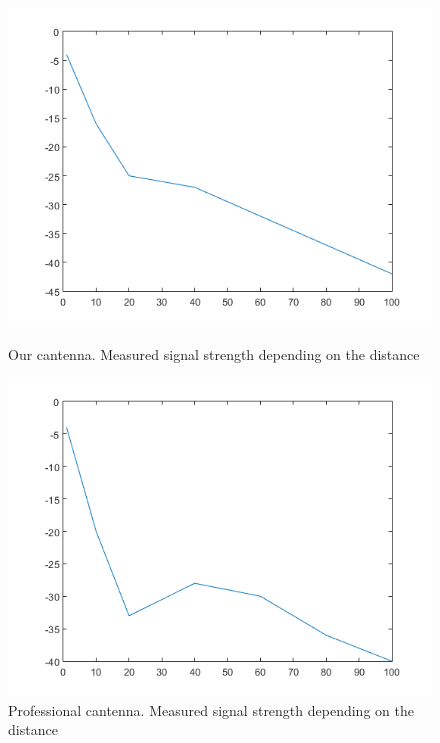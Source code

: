 \begin{figure}\begin{center}
		\includegraphics[width=\figurewidth]{plots/can_p.png}
		\caption{Our cantenna. Measured signal strength depending on the distance}
		\label{img:dist:pow:can}
		
		\includegraphics[width=\figurewidth]{plots/prof_p.png}
		\caption{Professional cantenna. Measured signal strength depending on the distance}
		\label{img:dist:pow:prof}
		

\end{center}
\end{figure}
